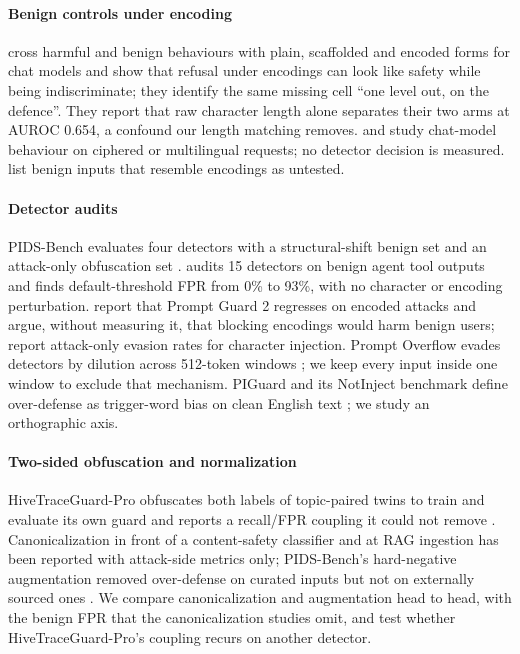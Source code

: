 \documentclass[conference]{IEEEtran}
\begin{document}
\paragraph{Benign controls under encoding} \citet{zhang2026refusing} cross harmful and benign behaviours with plain, scaffolded and encoded forms for chat models and show that refusal under encodings can look like safety while being indiscriminate; they identify the same missing cell ``one level out, on the defence''. They report that raw character length alone separates their two arms at AUROC 0.654, a confound our length matching removes. \citet{handa2024} and \citet{uysal2026} study chat-model behaviour on ciphered or multilingual requests; no detector decision is measured. \citet{zhang2026share} list benign inputs that resemble encodings as untested.

\paragraph{Detector audits} PIDS-Bench evaluates four detectors with a structural-shift benign set and an attack-only obfuscation set \citep{pidsbench2026}. \citet{liu2026passing} audits 15 detectors on benign agent tool outputs and finds default-threshold FPR from 0\% to 93\%, with no character or encoding perturbation. \citet{fairoze2026} report that Prompt Guard 2 regresses on encoded attacks and argue, without measuring it, that blocking encodings would harm benign users; \citet{hackett2025} report attack-only evasion rates for character injection. Prompt Overflow evades detectors by dilution across 512-token windows \citep{promptoverflow2026}; we keep every input inside one window to exclude that mechanism. PIGuard and its NotInject benchmark define over-defense as trigger-word bias on clean English text \citep{li2025piguard}; we study an orthographic axis.

\paragraph{Two-sided obfuscation and normalization} HiveTraceGuard-Pro obfuscates both labels of topic-paired twins to train and evaluate its own guard and reports a recall/FPR coupling it could not remove \citep{hivetrace2026}. Canonicalization in front of a content-safety classifier \citep{baszta2026} and at RAG ingestion \citep{hiddenplaintext2026} has been reported with attack-side metrics only; PIDS-Bench's hard-negative augmentation removed over-defense on curated inputs but not on externally sourced ones \citep{pidsbench2026}. We compare canonicalization and augmentation head to head, with the benign FPR that the canonicalization studies omit, and test whether HiveTraceGuard-Pro's coupling recurs on another detector.
\end{document}

